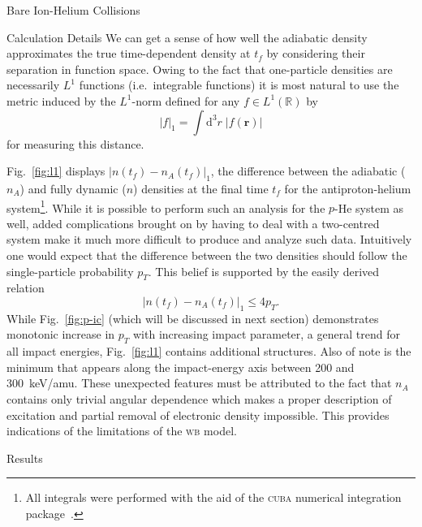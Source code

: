 \documentclass[letterpaper, 11 pt]{report}
\begin{document}
\begin{chapter}{Bare Ion-Helium Collisions \label{chap:p-he2p-he}}
\begin{section}{Calculation Details \label{sec:phe2p-det}}
      We can get a sense of how well the adiabatic density approximates the true time-dependent density
      at $t_f$ by considering their separation in function space. Owing to the fact that one-particle
      densities are necessarily $L^1$ functions (i.e.\ integrable functions) it is most natural to use
      the metric induced by the $L^1$-norm defined for any
      $f \in L^1\left(\mathbb{R}\right)$ by
      \begin{equation} \label{eq:l1rorm}
         \left| f \right|_1 = \int \mathrm{d}^3 r \; \left| f(\mathbf{r}) \right|
      \end{equation}
      for measuring this distance.

      Fig.~\ref{fig:l1} displays $\left| n(t_f) - n_A(t_f) \right|_1$, the difference between the
      adiabatic ($n_A$) and fully dynamic ($n$) densities at the final time $t_f$ for the
      antiproton-helium system\footnote{All integrals were performed with the aid of the \textsc{cuba}
      numerical integration package~\cite{cuba}.}. While it is possible to perform such an analysis for
      the $p$-He system as well, added complications brought on by having to deal with a two-centred
      system make it much more difficult to produce and analyze such data. Intuitively one would expect
      that the difference between the two densities should follow the single-particle probability $p_T$.
      This belief is supported by the easily derived relation
      \begin{equation} \label{eq:diff-bound}
         \left| n(t_f) - n_A(t_f) \right|_1 \leq 4 p_T.
      \end{equation}
      While Fig.~\ref{fig:p-ic} (which will be discussed in next section) demonstrates monotonic
      increase in $p_T$ with increasing impact parameter, a general trend for all impact energies,
      Fig.~\ref{fig:l1} contains additional structures. Also of note is the minimum that appears along
      the impact-energy axis between 200 and 300~keV/amu. These unexpected features must be attributed
      to the fact that $n_A$ contains only trivial angular dependence which makes a proper description
      of excitation and partial removal of electronic density impossible. This provides indications of
      the limitations of the \textsc{wb} model.

   \end{section}

   \begin{section}{Results \label{sec:phe2p-res}}


\end{section}
\end{chapter}
\end{document}
